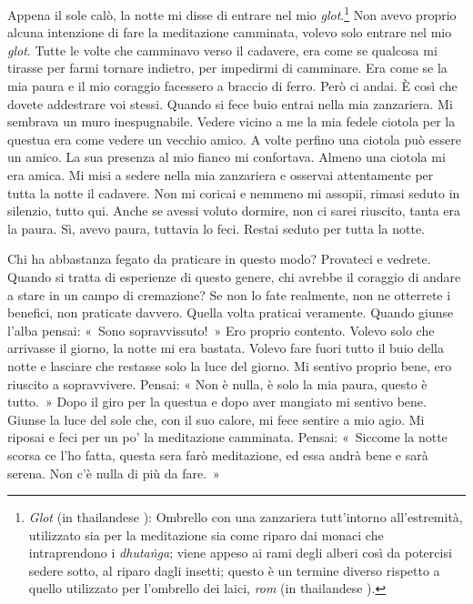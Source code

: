 Appena il sole calò, la notte mi disse di entrare nel mio
\emph{glot}.\footnote{\emph{Glot} (in thailandese ): Ombrello con una
  zanzariera tutt'intorno all'estremità, utilizzato sia per la
  meditazione sia come riparo dai monaci che intraprendono i
  \emph{dhutaṅga}; viene appeso ai rami degli alberi così da potercisi
  sedere sotto, al riparo dagli insetti; questo è un termine diverso
  rispetto a quello utilizzato per l'ombrello dei laici, \emph{rom} (in
  thailandese ).} Non avevo proprio alcuna intenzione di fare la
meditazione camminata, volevo solo entrare nel mio \emph{glot}. Tutte le
volte che camminavo verso il cadavere, era come se qualcosa mi tirasse
per farmi tornare indietro, per impedirmi di camminare. Era come se la
mia paura e il mio coraggio facessero a braccio di ferro. Però ci andai.
È così che dovete addestrare voi stessi. Quando si fece buio entrai
nella mia zanzariera. Mi sembrava un muro inespugnabile. Vedere vicino a
me la mia fedele ciotola per la questua era come vedere un vecchio
amico. A volte perfino una ciotola può essere un amico. La sua presenza
al mio fianco mi confortava. Almeno una ciotola mi era amica. Mi misi a
sedere nella mia zanzariera e osservai attentamente per tutta la notte
il cadavere. Non mi coricai e nemmeno mi assopii, rimasi seduto in
silenzio, tutto qui. Anche se avessi voluto dormire, non ci sarei
riuscito, tanta era la paura. Sì, avevo paura, tuttavia lo feci. Restai
seduto per tutta la notte.

Chi ha abbastanza fegato da praticare in questo modo? Provateci e
vedrete. Quando si tratta di esperienze di questo genere, chi avrebbe il
coraggio di andare a stare in un campo di cremazione? Se non lo fate
realmente, non ne otterrete i benefici, non praticate davvero. Quella
volta praticai veramente. Quando giunse l'alba pensai: «~Sono
sopravvissuto!~» Ero proprio contento. Volevo solo che arrivasse il
giorno, la notte mi era bastata. Volevo fare fuori tutto il buio della
notte e lasciare che restasse solo la luce del giorno. Mi sentivo
proprio bene, ero riuscito a sopravvivere. Pensai: « Non è nulla, è solo
la mia paura, questo è tutto.~» Dopo il giro per la questua e dopo aver
mangiato mi sentivo bene. Giunse la luce del sole che, con il suo
calore, mi fece sentire a mio agio. Mi riposai e feci per un po' la
meditazione camminata. Pensai: «~Siccome la notte scorsa ce l'ho fatta,
questa sera farò meditazione, ed essa andrà bene e sarà serena. Non c'è
nulla di più da fare.~»

